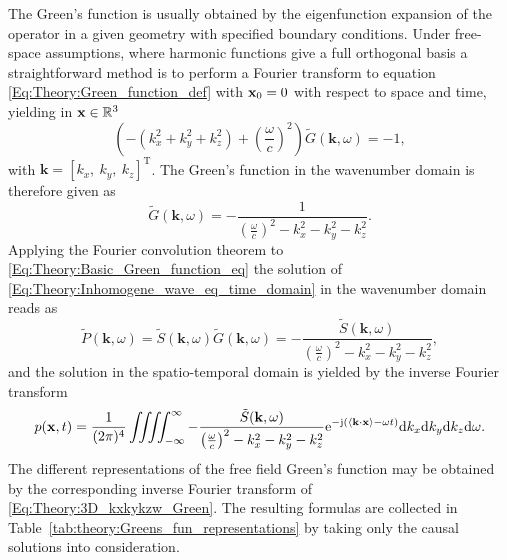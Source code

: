 The Green's function is usually obtained by the eigenfunction expansion of the operator in a given geometry with specified boundary conditions. 
Under free-space assumptions, where harmonic functions give a full orthogonal basis a straightforward method is to perform a Fourier transform to equation \eqref{Eq:Theory:Green_function_def} with $\mathbf{x}_0 = 0$ with respect to space and time, yielding in $\mathbf{x} \in \mathbb{R}^{3}$
\begin{equation}
\left(-(k_x^2 + k_y^2 + k_z^2) + \left(\frac{\omega}{c} \right)^2\right)\tilde{G}(\mathbf{k},\omega) = -1,
\end{equation}
with $\mathbf{k} = [k_x,\ k_y,\ k_z]^{\mathrm{T}}$.
The Green's function in the wavenumber domain is therefore given as \cite{Devaney2012, Watanabe2015}
\begin{equation}
\tilde{G}(\mathbf{k},\omega) = -\frac{1}{\left( \frac{\omega}{c}\right)^2 -  k_x^2 - k_y^2 - k_z^2 }.
\label{Eq:Theory:3D_kxkykzw_Green}
\end{equation}
Applying the Fourier convolution theorem to \eqref{Eq:Theory:Basic_Green_function_eq} the solution of \eqref{Eq:Theory:Inhomogene_wave_eq_time_domain} in the wavenumber domain reads as
\begin{equation}
\tilde{P}(\mathbf{k},\omega)  = \tilde{S}(\mathbf{k},\omega) \tilde{G}(\mathbf{k},\omega) = -\frac{\tilde{S}(\mathbf{k},\omega)}{\left( \frac{\omega}{c}\right)^2 -  k_x^2 - k_y^2 - k_z^2 },
\end{equation}
and the solution in the spatio-temporal domain is yielded by the inverse Fourier transform
\begin{equation}
p(\mathbf{x},t) =\frac{1}{(2\pi)^4} \iiiint^{\infty}_{-\infty} - \frac{\tilde{S}(\mathbf{k},\omega)}{\left( \frac{\omega}{c}\right)^2 -  k_x^2 - k_y^2 - k_z^2 } \mathrm{e}^{-\mathrm{j} \left( \left< \mathbf{k} \cdot \mathbf{x} \right> - \omega t \right) } \mathrm{d} k_x \mathrm{d} k_y \mathrm{d} k_z \mathrm{d} \omega.
\end{equation}
The different representations of the free field Green's function may be obtained by the corresponding inverse Fourier transform of \eqref{Eq:Theory:3D_kxkykzw_Green}.
The resulting formulas are collected in Table\ \ref{tab:theory:Greens_fun_representations} by taking only the causal solutions into consideration.

